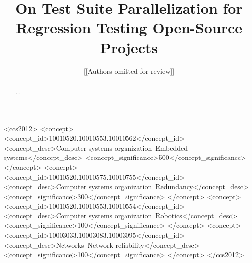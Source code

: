 \documentclass[sigconf]{acmart}
\begin{document}






\title{On Test Suite Parallelization for Regression Testing Open-Source Projects}





\author{[[Authors omitted for review]]}


\begin{abstract}
  ...
\end{abstract}


\begin{CCSXML}
<ccs2012>
 <concept>
  <concept_id>10010520.10010553.10010562</concept_id>
  <concept_desc>Computer systems organization~Embedded systems</concept_desc>
  <concept_significance>500</concept_significance>
 </concept>
 <concept>
  <concept_id>10010520.10010575.10010755</concept_id>
  <concept_desc>Computer systems organization~Redundancy</concept_desc>
  <concept_significance>300</concept_significance>
 </concept>
 <concept>
  <concept_id>10010520.10010553.10010554</concept_id>
  <concept_desc>Computer systems organization~Robotics</concept_desc>
  <concept_significance>100</concept_significance>
 </concept>
 <concept>
  <concept_id>10003033.10003083.10003095</concept_id>
  <concept_desc>Networks~Network reliability</concept_desc>
  <concept_significance>100</concept_significance>
 </concept>
</ccs2012>  
\end{CCSXML}
\end{document}
